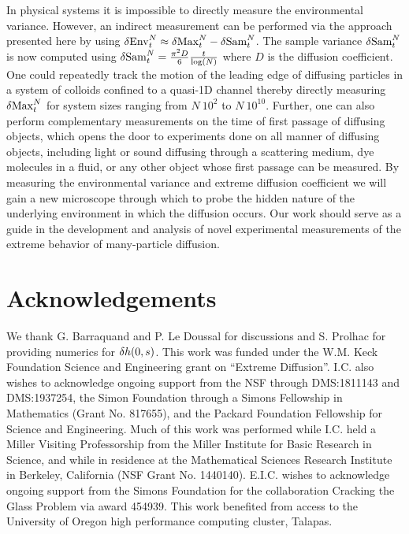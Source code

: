 In physical systems it is impossible to directly measure the environmental variance. However, an indirect measurement can be performed via the approach presented here by using $\var \mathrm{Env}^{N}_t\approx \var \mathrm{Max}^{N}_t - \var \mathrm{Sam}^{N}_t$. The sample variance $\var \mathrm{Sam}^{N}_t$ is now computed using
$
 \var \mathrm{Sam}^{N}_t = \frac{\pi^2 D}{6} \frac{t}{\log(N)}
$
where $D$ is the diffusion coefficient. One could repeatedly track the motion of the leading edge of diffusing particles in a system of colloids confined to a quasi-1D channel thereby directly measuring $\var \mathrm{Max}^{N}_t$ for system sizes ranging from $N ~ 10^2$ to $N ~ 10^{10}$. Further, one can also perform complementary measurements on the time of first passage of diffusing objects, which opens the door to experiments done on all manner of diffusing objects, including light or sound diffusing through a scattering medium, dye molecules in a fluid, or any other object whose first passage can be measured.
By measuring the environmental variance and extreme diffusion coefficient we will gain a new microscope through which to probe the hidden nature of the underlying environment in which the diffusion occurs. Our work should serve as a guide in the development and analysis of novel experimental measurements of the extreme behavior of many-particle diffusion.

\section{Acknowledgements}
We thank G. Barraquand and P. Le Doussal for discussions and S. Prolhac for providing numerics for $\var{h(0,s)}$.
This work was funded under the W.M. Keck Foundation Science and Engineering grant on ``Extreme Diffusion''.
I.C. also wishes to acknowledge ongoing support from the NSF through DMS:1811143 and DMS:1937254, the Simon Foundation through a Simons Fellowship in Mathematics (Grant No. 817655), and the Packard Foundation Fellowship for Science and Engineering. Much of this work was performed while I.C. held a Miller Visiting Professorship from the Miller Institute for Basic Research in Science, and while in residence at the Mathematical Sciences Research Institute in Berkeley, California (NSF Grant No. 1440140).
E.I.C. wishes to acknowledge ongoing support from the Simons Foundation for the collaboration Cracking the Glass Problem via award 454939. This work benefited from access to the University of Oregon high performance computing cluster, Talapas.


